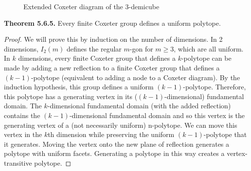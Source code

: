 \documentclass[../main.tex]{subfiles}
\begin{document}
\begin{figure}[!h]
\centering
{}
\caption{Extended Coxeter diagram of the $3$-demicube}
\end{figure}

\noindent\textbf{Theorem 5.6.5.} Every finite Coxeter group defines a uniform polytope.
\begin{proof}
    We will prove this by induction on the number of dimensions. In 2 dimensions, $I_2(m)$ defines the regular $m$-gon for $m\geq3$, which are all uniform. In $k$ dimensions, every finite Coxeter group that defines a $k$-polytope can be made by adding a new reflection to a finite Coxeter group that defines a $(k-1)$-polytope (equivalent to adding a node to a Coxeter diagram). By the induction hypothesis, this group defines a uniform $(k-1)$-polytope. Therefore, this polytope has a generating vertex in its ($(k-1)$-dimensional) fundamental domain. The $k$-dimensional fundamental domain (with the added reflection) contains the $(k-1)$-dimensional fundamental domain and so this vertex is the generating vertex of a (not necessarily uniform) n-polytope. We can move this vertex in the $k$th dimension while preserving the uniform $(k-1)$-polytope that it generates. Moving the vertex onto the new plane of reflection generates a polytope with uniform facets. Generating a polytope in this way creates a vertex-transitive polytope.
\end{proof}
\end{document}
